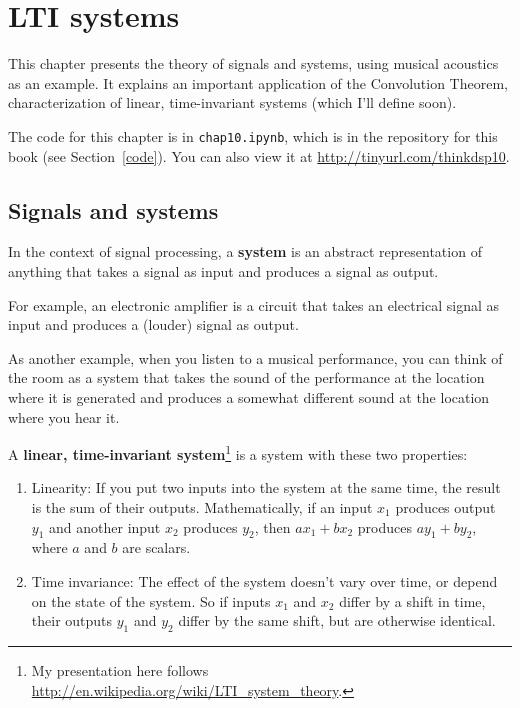 \chapter{LTI systems}
\label{systems}

This chapter presents the theory of signals and systems, using
musical acoustics as an example.  It explains an
important application of the Convolution Theorem, characterization
of linear, time-invariant systems (which I'll define soon).

The code for this chapter is in {\tt chap10.ipynb}, which is in the
repository for this book (see Section~\ref{code}).
You can also view it at \url{http://tinyurl.com/thinkdsp10}.



\section{Signals and systems}

In the context of signal processing, a {\bf system} is an abstract
representation of anything that takes a signal as input and produces
a signal as output.

For example, an electronic amplifier is a circuit that takes an
electrical signal as input and produces a (louder) signal as output.

As another example, when you listen to a musical performance, you
can think of the room as a system that takes the sound of the
performance at the location where it is generated and produces a
somewhat different sound at the location where you hear it.

A {\bf linear, time-invariant system}\footnote{My presentation here
	follows \url{http://en.wikipedia.org/wiki/LTI_system_theory}.} is a
system with these two properties:

\begin{enumerate}
	
	\item Linearity: If you put two inputs into the system at the same
	time, the result is the sum of their outputs.  Mathematically, if an
	input $x_1$ produces output $y_1$ and another input $x_2$ produces
	$y_2$, then $a x_1 + b x_2$ produces $a y_1 + b y_2$, where $a$ and
	$b$ are scalars.
	
	\item Time invariance: The
	effect of the system doesn't vary over time, or depend on the state
	of the system.  So if inputs $x_1$ and $x_2$ differ by a shift in time,
	their outputs $y_1$ and $y_2$ differ by the same shift, but are otherwise
	identical.
	
\end{enumerate}

